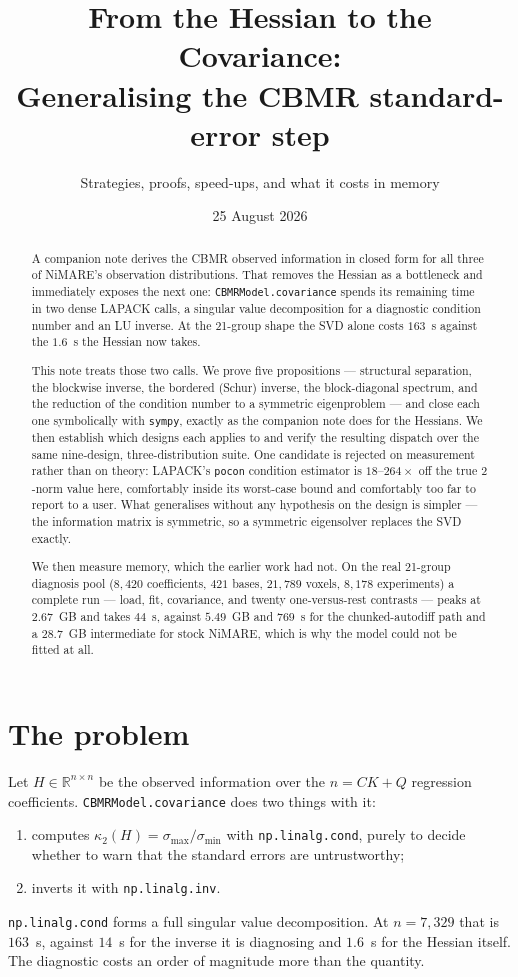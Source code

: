 \documentclass[11pt,a4paper]{article}
\title{From the Hessian to the Covariance:\\
Generalising the CBMR standard-error step}
\author{Strategies, proofs, speed-ups, and what it costs in memory}
\date{25 August 2026}
\theoremstyle{plain}
\theoremstyle{definition}
\newcommand{\R}{\mathbb{R}}
\newcommand{\cond}{\kappa}
\begin{document}
\maketitle

\begin{abstract}
A companion note derives the CBMR observed information in closed form for all three of NiMARE's
observation distributions. That removes the Hessian as a bottleneck and immediately exposes the
next one: \texttt{CBMRModel.covariance} spends its remaining time in two dense LAPACK calls, a
singular value decomposition for a diagnostic condition number and an LU inverse. At the
21-group shape the SVD alone costs $163$~s against the $1.6$~s the Hessian now takes.

This note treats those two calls. We prove five propositions --- structural separation, the
blockwise inverse, the bordered (Schur) inverse, the block-diagonal spectrum, and the reduction
of the condition number to a symmetric eigenproblem --- and close each one symbolically with
\texttt{sympy}, exactly as the companion note does for the Hessians. We then establish which
designs each applies to and verify the resulting dispatch over the same nine-design,
three-distribution suite. One candidate is rejected on measurement rather
than on theory: LAPACK's \texttt{pocon} condition estimator is $18$--$264\times$ off the true
$2$-norm value here, comfortably inside its worst-case bound and comfortably too far to report
to a user. What generalises without any hypothesis on the design is simpler --- the information
matrix is symmetric, so a symmetric eigensolver replaces the SVD exactly.

We then measure memory, which the earlier work had not. On the real 21-group diagnosis pool
($8{,}420$ coefficients, $421$ bases, $21{,}789$ voxels, $8{,}178$ experiments) a complete run
--- load, fit, covariance, and twenty one-versus-rest contrasts --- peaks at $2.67$~GB and takes
$44$~s, against $5.49$~GB and $769$~s for the chunked-autodiff path and a $28.7$~GB intermediate
for stock NiMARE, which is why the model could not be fitted at all.
\end{abstract}

\tableofcontents

\section{The problem}

Let $H \in \R^{n\times n}$ be the observed information over the $n = CK + Q$ regression
coefficients. \texttt{CBMRModel.covariance} does two things with it:
\begin{enumerate}
  \item computes $\cond_2(H) = \sigma_{\max}/\sigma_{\min}$ with \texttt{np.linalg.cond}, purely
        to decide whether to warn that the standard errors are untrustworthy;
  \item inverts it with \texttt{np.linalg.inv}.
\end{enumerate}
\texttt{np.linalg.cond} forms a full singular value decomposition. At $n = 7{,}329$ that is
$163$~s, against $14$~s for the inverse it is diagnosing and $1.6$~s for the Hessian itself.
The diagnostic costs an order of magnitude more than the quantity.
\end{document}

